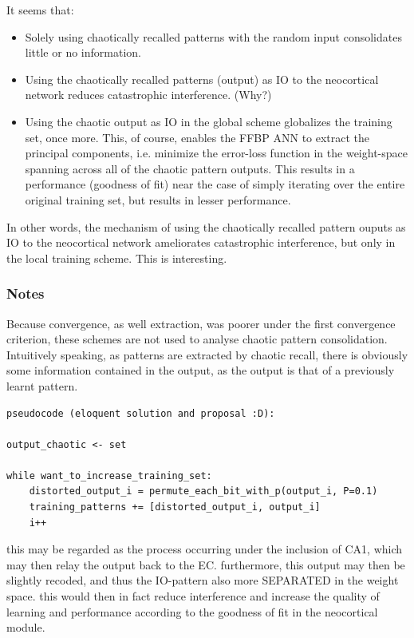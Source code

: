 It seems that:

\begin{itemize}
    \item Solely using chaotically recalled patterns with the random input consolidates little or no information.
    \item Using the chaotically recalled patterns (output) as IO to the neocortical network reduces catastrophic interference. (Why?)
    \item Using the chaotic output as IO in the global scheme globalizes the training set, once more. This, of course, enables the FFBP ANN to extract the principal components, i.e. minimize the error-loss function in the weight-space spanning across all of the chaotic pattern outputs. This results in a performance (goodness of fit) near the case of simply iterating over the entire original training set, but results in lesser performance.
\end{itemize}

In other words, the mechanism of using the chaotically recalled pattern ouputs as IO to the neocortical network ameliorates catastrophic interference, but only in the local training scheme. This is interesting.

\subsubsection{Notes}

Because convergence, as well extraction, was poorer under the first convergence criterion, these schemes are not used to analyse chaotic pattern consolidation.
Intuitively speaking, as patterns are extracted by chaotic recall, there is obviously some information contained in the output, as the output is that of a previously learnt pattern.

\begin{verbatim}
pseudocode (eloquent solution and proposal :D):

output_chaotic <- set

while want_to_increase_training_set:
	distorted_output_i = permute_each_bit_with_p(output_i, P=0.1)
	training_patterns += [distorted_output_i, output_i]
	i++

\end{verbatim}

this may be regarded as the process occurring under the inclusion of CA1, which may then relay the output back to the EC. furthermore, this output may then be slightly recoded, and thus the IO-pattern also more SEPARATED in the weight space. this would then in fact reduce interference and increase the quality of learning and performance according to the goodness of fit in the neocortical module.


